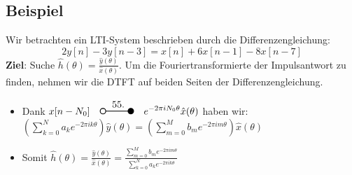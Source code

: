 \documentclass[11pt]{article}
\newcommand{\transform}[2]{%
    \begin{tikzpicture}
        \draw[thick] (0,0) circle (0.1);
        \draw[thick] (0.1,0) -- (#2,0) node[midway, above] {#1};
        \filldraw[thick] (#2,0) circle (0.1);
    \end{tikzpicture}%
}
\begin{document}
\pagebreak

\subsection*{Beispiel}
\vspace*{-0.5cm}
Wir betrachten ein LTI-System beschrieben durch die Differenzengleichung:
$$2 y[n] - 3y[n-3] = x[n] + 6x[n-1] - 8x[n-7]$$
\textbf{Ziel}: Suche $\hat{h}(\theta) = \displaystyle\frac{\hat{y}(\theta)}{\hat{x}(\theta)}$. Um die Fouriertransformierte der Impulsantwort zu finden, nehmen wir die DTFT auf beiden Seiten der Differenzengleichung.
\vspace*{-0.5cm}
\begin{itemize}[leftmargin = 0pt]
    \item[] Dank $x[n-N_0] \hspace{10pt} \displaystyle\transform{55.}{1} \hspace{10pt}\displaystyle e^{-2 \pi i N_0 \theta} \hat{x}(\theta)$ haben wir: $\displaystyle\left( \displaystyle\sum_{k=0}^N a_k e^{-2\pi i k \theta}\right)\hat{y}(\theta) = \displaystyle\left( \displaystyle\sum_{m=0}^M b_m e^{-2 \pi i m \theta}\right)\hat{x}(\theta)$
    \item[] Somit $\hat{h}(\theta)= \displaystyle\frac{\hat{y}(\theta)}{\hat{x}(\theta)} = \displaystyle\frac{\displaystyle\sum_{m=0}^M b_m e^{-2 \pi i m \theta}}{ \displaystyle\sum_{k=0}^N a_k e^{-2\pi i k \theta}}
    $
\end{itemize}
\end{document}
